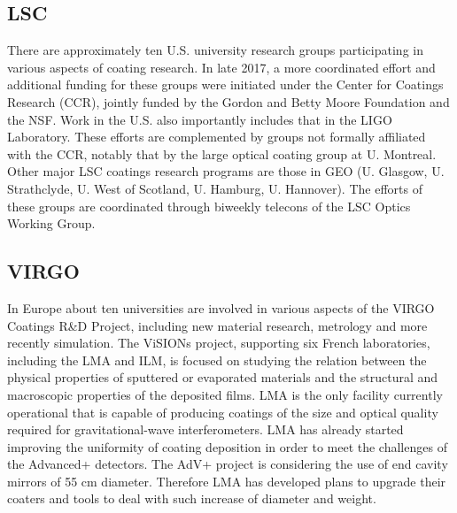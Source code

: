 \subsection{LSC}

There are approximately ten U.S. university research groups participating in various aspects of coating research. In late 2017, a more coordinated effort and additional funding for these groups were initiated under the Center for Coatings Research (CCR), jointly funded by the Gordon and Betty Moore Foundation and the NSF. Work in the U.S. also importantly includes that in the LIGO Laboratory. These efforts are complemented by groups not formally affiliated with the CCR, notably that by the large optical coating group at U. Montreal. Other major LSC coatings research programs are those in GEO (U. Glasgow, U. Strathclyde, U. West of Scotland, U. Hamburg, U. Hannover). The efforts of these groups are coordinated through biweekly telecons of the LSC Optics Working Group.

\subsection{VIRGO}

In Europe about ten universities are involved in various aspects of the VIRGO Coatings R\&D Project, including new material research, metrology and more recently simulation. The ViSIONs project, supporting six French laboratories, including the LMA and ILM, is focused on studying the relation between the physical properties of sputtered or evaporated materials and the structural and macroscopic properties of the deposited films. LMA is the only facility currently operational that is capable of producing coatings of the size and optical quality required for gravitational-wave interferometers. LMA has already started improving the uniformity of coating deposition in order to meet the challenges of the Advanced+ detectors. The AdV+ project is considering the use of end cavity mirrors of 55 cm diameter. Therefore LMA has developed plans to upgrade their coaters and tools to deal with such increase of diameter and weight.

